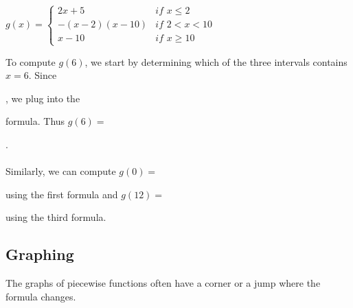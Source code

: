 \documentclass{ximera}
\begin{document}
\begin{example}
$g(x)=\begin{cases} 2x+5 & \textit{if }x\leq 2\\ -(x-2)(x-10) & \textit{if } 2<x<10\\ x-10 & \textit{if } x\geq 10\end{cases}$

To compute $g(6)$, we start by determining which of the three intervals contains $x=6$. Since 
\begin{multipleChoice}
  \end{multipleChoice}
  , we plug into the 
  \begin{multipleChoice}
  \end{multipleChoice}
formula. Thus $g(6)=$
\begin{multipleChoice}
  \end{multipleChoice}.\\
\\Similarly, we can compute $g(0)=$
\begin{multipleChoice}
  \end{multipleChoice} using the first formula and $g(12)=$ 
  \begin{multipleChoice}
  \end{multipleChoice}using the third formula.
\end{example}



\subsection*{Graphing}
The graphs of piecewise functions often have a corner or a jump where the formula changes. 
\end{document}
